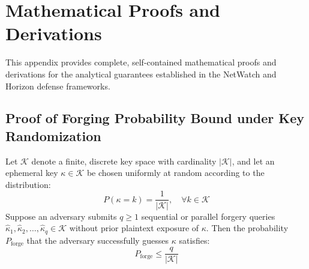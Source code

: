 \appendix
\chapter{Mathematical Proofs and Derivations}
\label{app:proofs}

This appendix provides complete, self-contained mathematical proofs and derivations for the analytical guarantees established in the NetWatch and Horizon defense frameworks.

\section{Proof of Forging Probability Bound under Key Randomization}
\label{app:proof_forging}

\begin{theorem}
Let $\mathcal{K}$ denote a finite, discrete key space with cardinality $|\mathcal{K}|$, and let an ephemeral key $\kappa \in \mathcal{K}$ be chosen uniformly at random according to the distribution:
\begin{equation}
    P(\kappa = k) = \frac{1}{|\mathcal{K}|}, \quad \forall k \in \mathcal{K}
\end{equation}
Suppose an adversary submits $q \ge 1$ sequential or parallel forgery queries $\hat{\kappa}_1, \hat{\kappa}_2, \dots, \hat{\kappa}_q \in \mathcal{K}$ without prior plaintext exposure of $\kappa$. Then the probability $P_{\mathrm{forge}}$ that the adversary successfully guesses $\kappa$ satisfies:
\begin{equation}
    P_{\mathrm{forge}} \le \frac{q}{|\mathcal{K}|}
\end{equation}
\end{theorem}

